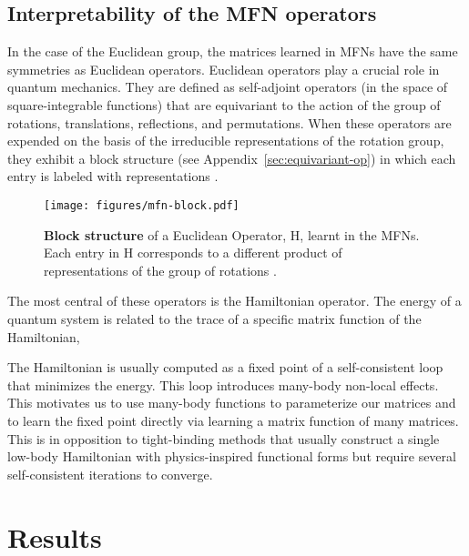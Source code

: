 \documentclass{article} \usepackage{iclr2024_conference,times}
\begin{document}
\vspace{-8pt}
\subsection{Interpretability of the MFN operators}
\vspace{-6pt}
In the case of the Euclidean group, the matrices learned in MFNs have the same symmetries as Euclidean operators.
Euclidean operators play a crucial role in quantum mechanics. They are defined as self-adjoint operators (in the space of square-integrable functions) that are equivariant to the action of the group of rotations, translations, reflections, and permutations. When these operators are expended on the basis of the irreducible representations of the rotation group, they exhibit a block structure (see Appendix~\ref{sec:equivariant-op}) in which each entry is labeled with representations . 
\begin{figure}[h!]
    \centering
\texttt{[image: figures/mfn-block.pdf]}
    \caption{\textbf{Block structure} of a Euclidean Operator, H, learnt in the MFNs. Each entry in H corresponds to a different product of representations of the group of rotations  .}
    \label{fig:enter-label}
\end{figure}

The most central of these operators is the Hamiltonian operator. The energy of a quantum system is related to the trace of a specific matrix function of the Hamiltonian,

The Hamiltonian is usually computed as a fixed point of a self-consistent loop that minimizes the energy. This loop introduces many-body non-local effects.
This motivates us to use many-body functions to parameterize our matrices and to learn the fixed point directly via learning a matrix function of many matrices. This is in opposition to tight-binding methods that usually construct a single low-body Hamiltonian with physics-inspired functional forms but require several self-consistent iterations to converge. 


\vspace{-6pt}
\section{Results}
\label{sec:resuts}
\vspace{-6pt}
\end{document}
